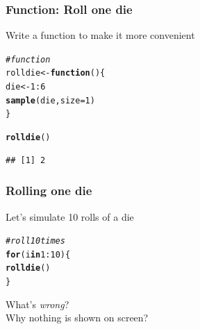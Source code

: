 \documentclass[12pt]{beamer}\usepackage[]{graphicx}\usepackage[]{color}
\makeatletter
\newcommand{\hlnum}[1]{\textcolor[rgb]{0.686,0.059,0.569}{#1}}%
\newcommand{\hlcom}[1]{\textcolor[rgb]{0.678,0.584,0.686}{\textit{#1}}}%
\newcommand{\hlopt}[1]{\textcolor[rgb]{0,0,0}{#1}}%
\newcommand{\hlstd}[1]{\textcolor[rgb]{0.345,0.345,0.345}{#1}}%
\newcommand{\hlkwa}[1]{\textcolor[rgb]{0.161,0.373,0.58}{\textbf{#1}}}%
\newcommand{\hlkwb}[1]{\textcolor[rgb]{0.69,0.353,0.396}{#1}}%
\newcommand{\hlkwc}[1]{\textcolor[rgb]{0.333,0.667,0.333}{#1}}%
\newcommand{\hlkwd}[1]{\textcolor[rgb]{0.737,0.353,0.396}{\textbf{#1}}}%
\newenvironment{kframe}{%
 \def\at@end@of@kframe{}%
 \ifinner\ifhmode%
  \def\at@end@of@kframe{\end{minipage}}%
  \begin{minipage}{\columnwidth}%
 \fi\fi%
 \def\FrameCommand##1{\hskip\@totalleftmargin \hskip-\fboxsep
 \colorbox{shadecolor}{##1}\hskip-\fboxsep
     \hskip-\linewidth \hskip-\@totalleftmargin \hskip\columnwidth}%
 \MakeFramed {\advance\hsize-\width
   \@totalleftmargin\z@ \linewidth\hsize
   \@setminipage}}%
 {\par\unskip\endMakeFramed%
 \at@end@of@kframe}
\newenvironment{knitrout}{}{} %
\makeatother
\begin{document}

\begin{frame}[fragile]
\frametitle{Function: Roll one die}

Write a function to make it more convenient
\begin{knitrout}\footnotesize
{}\color{fgcolor}\begin{kframe}
\begin{alltt}
\hlcom{# function}
\hlstd{rolldie} \hlkwb{<-} \hlkwa{function}\hlstd{() \{}
  \hlstd{die} \hlkwb{<-} \hlnum{1}\hlopt{:}\hlnum{6}
  \hlkwd{sample}\hlstd{(die,} \hlkwc{size} \hlstd{=} \hlnum{1}\hlstd{)}
\hlstd{\}}
\end{alltt}
\end{kframe}
\end{knitrout}

\pause
\begin{knitrout}\footnotesize
{}\color{fgcolor}\begin{kframe}
\begin{alltt}
\hlkwd{rolldie}\hlstd{()}
\end{alltt}
\begin{verbatim}
## [1] 2
\end{verbatim}
\end{kframe}
\end{knitrout}
\end{frame}


\begin{frame}[fragile]
\frametitle{Rolling one die}

Let's simulate 10 rolls of a die
\begin{knitrout}\footnotesize
{}\color{fgcolor}\begin{kframe}
\begin{alltt}
\hlcom{# roll 10 times}
\hlkwa{for} \hlstd{(i} \hlkwa{in} \hlnum{1}\hlopt{:}\hlnum{10}\hlstd{) \{}
  \hlkwd{rolldie}\hlstd{()}
\hlstd{\}}
\end{alltt}
\end{kframe}
\end{knitrout}

\pause
What's \textit{wrong}? \\
{\lolit Why nothing is shown on screen?}
\end{frame}
\end{document}
